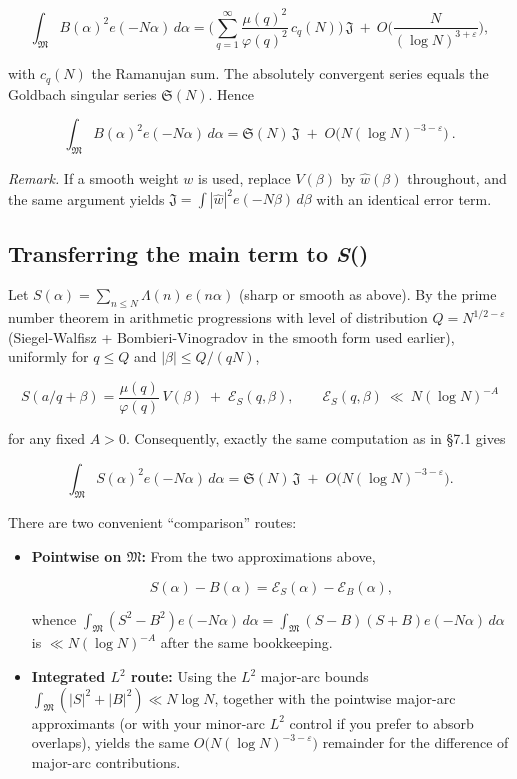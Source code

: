 \documentclass[11pt]{article}
\theoremstyle{definition}
\theoremstyle{remark}
\numberwithin{equation}{part}
\begin{document}
$$
	\int_{\mathfrak M} B(\alpha)^2 e(-N\alpha)\,d\alpha
	= \Big(\sum_{q=1}^{\infty}\frac{\mu(q)^2}{\varphi(q)^2}\,c_q(N)\Big)\,\mathfrak J
	\ +\ O\!\Big(\frac{N}{(\log N)^{3+\varepsilon}}\Big),
$$

with $c_q(N)$ the Ramanujan sum. The absolutely convergent series equals the Goldbach singular series $\mathfrak S(N)$. Hence

$$
	\boxed{\,\int_{\mathfrak M} B(\alpha)^2 e(-N\alpha)\,d\alpha
		=\mathfrak S(N)\,\mathfrak J\;+\;O\!\big(N(\log N)^{-3-\varepsilon}\big)\ .\ }
$$

\emph{Remark.} If a smooth weight $w$ is used, replace $V(\beta)$ by $\widehat w(\beta)$ throughout, and the same argument yields $\mathfrak J=\int|\widehat w|^2 e(-N\beta)\,d\beta$ with an identical error term.

\subsection{Transferring the main term to \textit{S}(\textalpha)}

Let $S(\alpha)=\sum_{n\le N}\Lambda(n)\,e(n\alpha)$ (sharp or smooth as above). By the prime number theorem in arithmetic progressions with level of distribution $Q=N^{1/2-\varepsilon}$ (Siegel-Walfisz + Bombieri-Vinogradov in the smooth form used earlier), uniformly for $q\le Q$ and $|\beta|\le Q/(qN)$,

$$
	S(a/q+\beta)=\frac{\mu(q)}{\varphi(q)}\,V(\beta) \;+\; \mathcal E_S(q,\beta),
	\qquad \mathcal E_S(q,\beta)\ \ll\ N(\log N)^{-A}
$$

for any fixed $A>0$. Consequently, exactly the same computation as in §7.1 gives

$$
	\int_{\mathfrak M} S(\alpha)^2 e(-N\alpha)\,d\alpha
	=\mathfrak S(N)\,\mathfrak J\;+\;O\!\big(N(\log N)^{-3-\varepsilon}\big).
$$

There are two convenient “comparison” routes:

\begin{itemize}
	\item \textbf{Pointwise on $\mathfrak M$:} From the two approximations above,

	      $$
		      S(\alpha)-B(\alpha)=\mathcal E_S(\alpha)-\mathcal E_B(\alpha),
	      $$

	      whence $\int_{\mathfrak M}(S^2-B^2)e(-N\alpha)\,d\alpha =\int_{\mathfrak M}(S-B)(S+B)e(-N\alpha)\,d\alpha$
	      is $\ll N(\log N)^{-A}$ after the same bookkeeping.

	\item \textbf{Integrated $L^2$ route:} Using the $L^2$ major-arc bounds $\int_{\mathfrak M}(|S|^2+|B|^2)\ll N\log N$, together with the pointwise major-arc approximants (or with your minor-arc $L^2$ control if you prefer to absorb overlaps), yields the same $O\big(N(\log N)^{-3-\varepsilon}\big)$ remainder for the difference of major-arc contributions.
\end{itemize}
\end{document}

